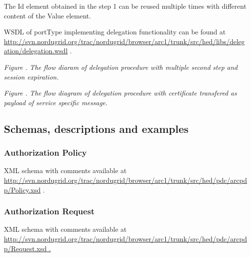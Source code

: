 \documentclass[a4paper]{article}
\newcommand\textstyleInternetlink[1]{\textcolor[rgb]{0.0,0.0,0.5019608}{#1}}
\newcounter{Figure}
\renewcommand\theFigure{\arabic{Figure}}
\begin{document}
{\color{black}
The Id element obtained in the step 1 can be reused multiple times with
different content of the Value element.}

{\color{black}
WSDL of portType implementing delegation functionality can be found at
\url{http://svn.nordugrid.org/trac/nordugrid/browser/arc1/trunk/src/hed/libs/delegation/delegation.wsdl}
.}

{\par}

{\centering{}\itshape\color{black}
Figure {\theFigure\label{seq:refFigure7}}. The
flow diaram of delegation procedure with multiple second step and
session expiration. 
\par}

{\par}

{\centering{}\itshape\color{black}
Figure {\theFigure\label{seq:refFigure8}}. The
flow diagram of delegation procedure with certificate transfered as
payload of service specific message. 
\par}

\subsection[Schemas, descriptions and examples]{Schemas, descriptions
and examples}
\subsubsection[Authorization Policy]{Authorization Policy}
\label{bkm:Ref204009564}{\upshape\color{black}
XML schema with comments available at
\url{http://svn.nordugrid.org/trac/nordugrid/browser/arc1/trunk/src/hed/pdc/arcpdp/Policy.xsd}
.}

\subsubsection[Authorization Request]{Authorization Request}
\label{bkm:Ref204009595}{\upshape\color{black}
XML schema with comments available at
\url{http://svn.nordugrid.org/trac/nordugrid/browser/arc1/trunk/src/hed/pdc/arcpdp/Request.xsd}\href{http://svn.nordugrid.org/trac/nordugrid/browser/arc1/trunk/src/hed/pdc/arcpdp/Policy.xsd}{\textstyleInternetlink{
.}}}
\end{document}

